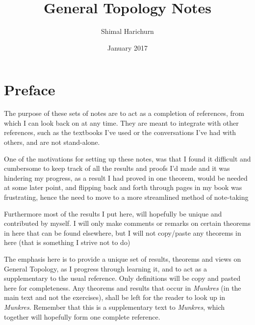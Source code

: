 \documentclass{article}
\title{General Topology Notes}
\author{Shimal Harichurn}
\date{January 2017}
\theoremstyle{remark}
\theoremstyle{definition}
\begin{document}
\maketitle

\newpage

\tableofcontents

\newpage

\section*{Preface}

\begin{flushleft}

The purpose of these sets of notes are to act as a completion of references, from which I can look back on at any time. They are meant to integrate with other references, such as the textbooks I've used or the conversations I've had with others, and are not stand-alone. 
\end{flushleft}

\begin{flushleft}
One of the motivations for setting up these notes, was that I found it difficult and cumbersome to keep track of all the results and proofs I'd made and it was hindering my progress, as a result I had proved in one theorem, would be needed at some later point, and flipping back and forth through pages in my book was frustrating, hence the need to move to a more streamlined method of note-taking
\end{flushleft}

\begin{flushleft}
Furthermore most of the results I put here, will hopefully be unique and contributed by myself. I will only make comments or remarks on certain theorems in here that can be found elsewhere, but I will not copy/paste any theorems in here (that is something I strive not to do)

\end{flushleft}

\begin{flushleft}
The emphasis here is to provide a unique set of results, theorems and views on General Topology, as I progress through learning it, and to act as a supplementary to the usual reference. Only definitions will be copy and pasted here for completeness. Any theorems and results that occur in \textit{Munkres} (in the main text and not the exercises), shall be left for the reader to look up in \textit{Munkres}. Remember that this is a supplementary text to \textit{Munkres}, which together will hopefully form one complete reference. 

\end{flushleft}
\end{document}
